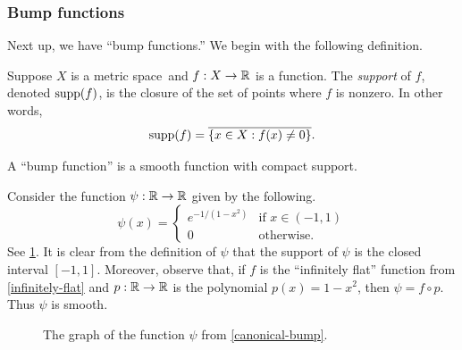 \subsubsection*{Bump functions}

Next up, we have ``bump functions.'' We begin with the following definition. 

\begin{definition}  \label{support}
	Suppose $X$ is a metric space\footnotemark\ and $f : X \to \mathbb{R}$ is a function. The \emph{support} of $f$, denoted $\operatorname{supp}(f)$, is the closure of the set of points where $f$ is nonzero. In other words, 
	\[ \operatorname{supp}(f) = \overline{\{ x \in X : f(x) \neq 0 \}}. \]
\end{definition}


A ``bump function'' is a smooth function with compact support. 

\begin{example} \label{canonical-bump}
	Consider the function $\psi : \mathbb{R} \to \mathbb{R}$ given by the following. 
	\[ \psi(x) = \begin{cases} e^{-1/(1-x^2)} & \text{if } x \in (-1,1) \\ 0 & \text{otherwise}. \end{cases} \]
	See \cref{canonical-bump-graph}. 
	It is clear from the definition of $\psi$ that the support of $\psi$ is the closed interval $[-1,1]$. Moreover, observe that, if $f$ is the ``infinitely flat'' function from \cref{infinitely-flat} and $p : \mathbb{R} \to \mathbb{R}$ is the polynomial $p(x) = 1-x^2$, then $\psi = f \circ p$. Thus $\psi$ is smooth. 
	\begin{figure}[ht]
		\begin{center}
		\end{center}
		\caption{The graph of the function $\psi$ from \cref{canonical-bump}.}  \label{canonical-bump-graph}
	\end{figure}
\end{example}

